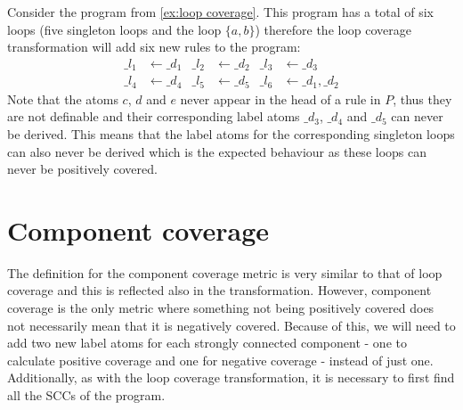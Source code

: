 \begin{example}
\label{ex:loop transformation}
    Consider the program from \cref{ex:loop coverage}. This program has a total of six loops (five singleton loops and the loop $\{a, b\}$) therefore the loop coverage transformation will add six new rules to the program:
    \begin{align*}
        \_l_1 &\leftarrow \_d_1  &  \_l_2 &\leftarrow \_d_2  &  \_l_3 &\leftarrow \_d_3 \\
        \_l_4 &\leftarrow \_d_4  &  \_l_5 &\leftarrow \_d_5  &  \_l_6 &\leftarrow \_d_1, \_d_2 
    \end{align*}
    Note that the atoms $c$, $d$ and $e$ never appear in the head of a rule in $P$, thus they are not definable and their corresponding label atoms $\_d_3$, $\_d_4$ and $\_d_5$ can never be derived. This means that the label atoms for the corresponding singleton loops can also never be derived which is the expected behaviour as these loops can never be positively covered.
\end{example}

\section{Component coverage}
\label{sec:Computing coverage metrics for propositional programs/Component coverage}
The definition for the component coverage metric is very similar to that of loop coverage and this is reflected also in the transformation. However, component coverage is the only metric where something not being positively covered does not necessarily mean that it is negatively covered. Because of this, we will need to add two new label atoms for each strongly connected component - one to calculate positive coverage and one for negative coverage - instead of just one. Additionally, as with the loop coverage transformation, it is necessary to first find all the SCCs of the program.


